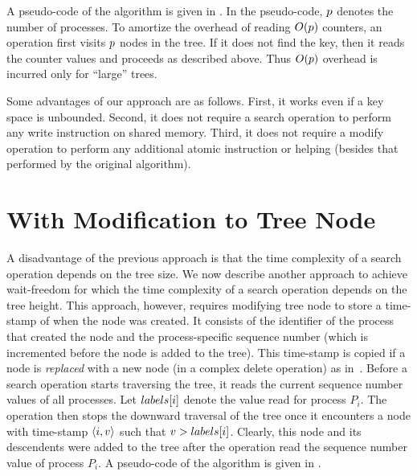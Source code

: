 \begin{limitscope}
A pseudo-code of the algorithm is given in . In the pseudo-code, $p$ denotes the number of processes. To amortize the overhead of reading $O(p)$ counters, an operation first visits $p$ nodes in the tree. If it does not find the key, then it reads the counter values and proceeds as described above. Thus $O(p)$ overhead is incurred only for ``large'' trees.

Some advantages of our approach are as follows. First, it works even if a key space is unbounded. Second, it does not require a search operation to perform any write instruction on shared memory. Third, it does not require a modify operation to perform any additional atomic instruction or helping (besides that performed by the original algorithm). 



\section{With Modification to Tree Node}
A disadvantage of the previous approach is that the time complexity of a search operation depends on the tree size. We now describe another approach to achieve wait-freedom for which the time complexity of a search operation depends on the tree height. This approach, however, requires modifying tree node to store a time-stamp of when the node was created. It consists of the identifier of the process that created the node and the process-specific sequence number (which is incremented before the node is added to the tree). This time-stamp is copied if a node is \emph{replaced} with a new node (in a complex delete operation) as in~\cite{RamMit:2015:ICDCN}. Before a search operation starts traversing the tree, it reads the current sequence number values of all processes. Let $labels[i]$ denote the value read for process $P_i$. The operation then stops the downward traversal of the tree once it encounters a node with time-stamp $\langle i,v \rangle$ such that $v > labels[i]$. Clearly, this node and its descendents were added to the tree after the operation read the sequence number value of process $P_i$.
A pseudo-code of the algorithm is given in .
\end{limitscope}